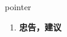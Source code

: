
\begin{frame}
{\huge pointer}
\begin{center}
\begin{enumerate}\Large
  \item \textbf{忠告，建议}
\end{enumerate}
\end{center}
\end{frame}

